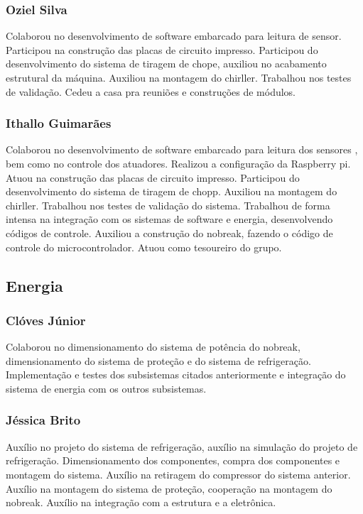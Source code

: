 \begin{apendicesenv}
\subsubsection{Oziel Silva}

Colaborou no desenvolvimento de software embarcado para leitura de sensor. 
Participou na construção das placas de circuito impresso. 
Participou do desenvolvimento do sistema de tiragem de chope, 
auxiliou no acabamento estrutural da máquina. Auxiliou na montagem do chirller. 
Trabalhou nos testes de validação. Cedeu a casa pra reuniões e construções de módulos.

\subsubsection{Ithallo Guimarães}

Colaborou no desenvolvimento de software embarcado para leitura dos sensores , bem como no controle dos atuadores.  
Realizou a configuração da Raspberry pi. Atuou na construção das placas de circuito impresso. 
Participou do desenvolvimento do sistema de tiragem de chopp. 
Auxiliou na montagem do chirller. 
Trabalhou nos testes de validação do sistema.
Trabalhou de forma intensa na integração com os sistemas de software e energia, desenvolvendo códigos de controle.
Auxiliou a construção do nobreak, fazendo o código de controle do microcontrolador.
Atuou como tesoureiro do grupo.

\subsection{Energia}

\subsubsection{Clóves Júnior}

Colaborou no dimensionamento do sistema de potência do nobreak, dimensionamento do sistema de proteção e
do sistema de refrigeração. Implementação e testes dos subsistemas citados anteriormente e integração do
sistema de energia com os outros subsistemas.

\subsubsection{Jéssica Brito}

Auxílio no projeto do sistema de refrigeração,
auxílio na simulação do projeto de refrigeração. 
Dimensionamento dos componentes, compra dos componentes e montagem do sistema. 
Auxílio na retiragem do compressor do sistema anterior. 
Auxílio na montagem do sistema de proteção, cooperação na montagem do nobreak.
Auxílio na integração com a estrutura e a eletrônica.


\end{apendicesenv}
